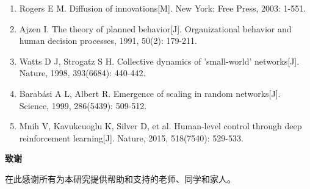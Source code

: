 \documentclass[12pt,a4paper]{article}
\newcommand{\heiti}{\CJKfamily{zhhei}}  %
\numberwithin{equation}{section}
\begin{document}
\vspace{0.5\baselineskip}

\begin{enumerate}
    \item Rogers E M. Diffusion of innovations[M]. New York: Free Press, 2003: 1-551.
    \item Ajzen I. The theory of planned behavior[J]. Organizational behavior and human decision processes, 1991, 50(2): 179-211.
    \item Watts D J, Strogatz S H. Collective dynamics of 'small-world' networks[J]. Nature, 1998, 393(6684): 440-442.
    \item Barabási A L, Albert R. Emergence of scaling in random networks[J]. Science, 1999, 286(5439): 509-512.
    \item Mnih V, Kavukcuoglu K, Silver D, et al. Human-level control through deep reinforcement learning[J]. Nature, 2015, 518(7540): 529-533.
\end{enumerate}

\newpage

\begin{center}
    {\fontsize{18}{18}\bfseries\heiti 致谢}
\end{center}

\vspace{0.5\baselineskip}

在此感谢所有为本研究提供帮助和支持的老师、同学和家人。
\end{document}
